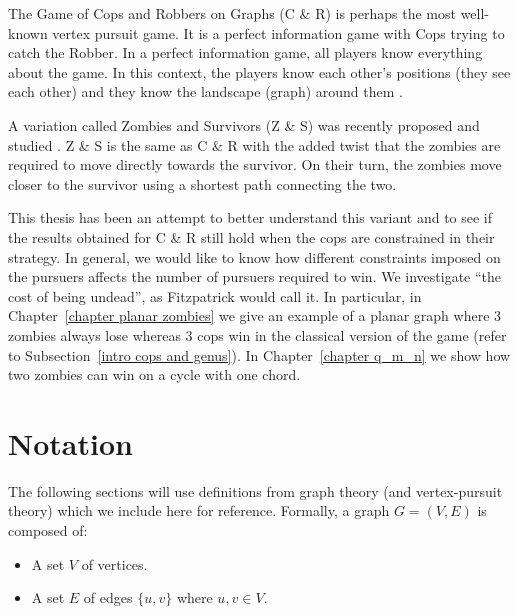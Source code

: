 The Game of Cops and Robbers on Graphs (C \& R) \cite{bonato2011game} is perhaps the most
well-known vertex pursuit game. It is a perfect information game with Cops trying
to catch the Robber. In a perfect information game, all players know everything about the game.
In this context, the players know each other's positions (they see each other) and they
know the landscape (graph) around them \cite{schaefer1978complexity}.

A variation called Zombies and Survivors (Z \& S) was recently proposed and studied  \cite{fitzpatrick2016deterministic, fitzpatrick2018game}.
Z \& S is the same as C \& R with the added twist that the zombies are required to move directly towards the survivor. On their turn, the zombies move closer to the survivor using a shortest path connecting the two.

This thesis has been an attempt to better understand this variant and
to see if the results obtained for C \& R still hold when the cops
are constrained in their strategy. In general, we would like to know how different constraints imposed on the pursuers affects the number of pursuers required to win. We investigate ``the cost of being undead'', as Fitzpatrick \cite{fitzpatrick2016deterministic} would call it.
In particular, in Chapter~\ref{chapter planar zombies}
we give an example of a planar graph where 3 zombies always lose whereas 3 cops win in the classical version of the game (refer to Subsection~\ref{intro cops and genus}).
In Chapter~\ref{chapter q_m_n} we show how two zombies can win on a cycle with one chord.

\section{Notation}

The following sections will use definitions from graph theory (and vertex-pursuit theory) which we include here for reference. Formally, a graph $G = (V, E)$ is composed of:

\begin{itemize}
\item A set $V$ of vertices.
\item A set $E$ of edges $\{u,v\}$ where $u, v \in V$.
\end{itemize}

